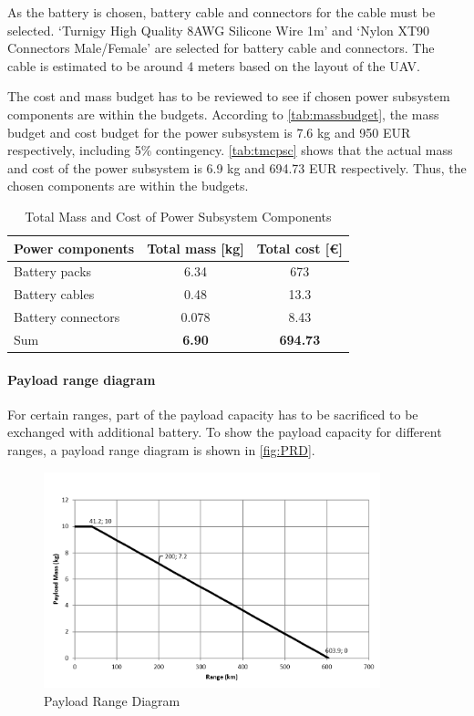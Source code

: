 {As the battery is chosen, battery cable and connectors for the cable must be selected. `Turnigy High Quality 8AWG Silicone Wire 1m' and `Nylon XT90 Connectors Male/Female' are selected for battery cable and connectors. The cable is estimated to be around 4 meters based on the layout of the UAV. %

The cost and mass budget has to be reviewed to see if chosen power subsystem components are within the budgets. According to \autoref{tab:massbudget}, the mass budget and cost budget for the power subsystem is 7.6 kg and 950 EUR respectively, including 5\% contingency. \autoref{tab:tmcpsc} shows that the actual mass and cost of the power subsystem is 6.9 kg and 694.73 EUR respectively. Thus, the chosen components are within the budgets.

\begin{table}[H]
\centering
\caption{Total Mass and Cost of Power Subsystem Components}
\label{tab:tmcpsc}
    \begin{tabular}{lcc}
    \toprule
    \bfseries Power components   &\bfseries  Total mass [kg] &\bfseries Total cost [\euro] \\\midrule
    Battery packs      & 6.34            & 673                \\\hdashline
    Battery cables     & 0.48            & 13.3               \\\hdashline
    Battery connectors & 0.078           & 8.43               \\\hdashline
    Sum                & \textbf{6.90}            & \textbf{694.73}        \\\bottomrule       
    \end{tabular}
\end{table}

\paragraph{Payload range diagram} For certain ranges, part of the payload capacity has to be sacrificed to be exchanged with additional battery. To show the payload capacity for different ranges, a payload range diagram is shown in \autoref{fig:PRD}.

\begin{figure}[H]
    \centering
    \includegraphics[width=0.87\textwidth]{PowerPropulsion/Figures/PRDiagram.png}
    \caption{Payload Range Diagram}
    \label{fig:PRD}
\end{figure}

}
